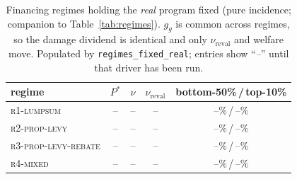 \documentclass[12pt]{article}
\providecommand{\pendingnum}{\textit{--}}
\providecommand{\RDefRealP}{\pendingnum}\providecommand{\RLevRealP}{\pendingnum}
\providecommand{\RRebRealP}{\pendingnum}\providecommand{\RMixRealP}{\pendingnum}
\providecommand{\RDefRealRev}{\pendingnum}\providecommand{\RLevRealRev}{\pendingnum}
\providecommand{\RRebRealRev}{\pendingnum}\providecommand{\RMixRealRev}{\pendingnum}
\providecommand{\RDefRealNu}{\pendingnum}\providecommand{\RLevRealNu}{\pendingnum}
\providecommand{\RRebRealNu}{\pendingnum}\providecommand{\RMixRealNu}{\pendingnum}
\providecommand{\RDefRealBfifty}{\pendingnum}\providecommand{\RLevRealBfifty}{\pendingnum}
\providecommand{\RRebRealBfifty}{\pendingnum}\providecommand{\RMixRealBfifty}{\pendingnum}
\providecommand{\RDefRealTten}{\pendingnum}\providecommand{\RLevRealTten}{\pendingnum}
\providecommand{\RRebRealTten}{\pendingnum}\providecommand{\RMixRealTten}{\pendingnum}
\begin{document}
\begin{table}[!htb]
\centering
\caption{Financing regimes holding the \emph{real} program fixed (pure
incidence; companion to Table~\ref{tab:regimes}). $g_g$ is common across
regimes, so the damage dividend is identical and only $\nu_{\mathrm{reval}}$ and
welfare move. Populated by \texttt{regimes\_fixed\_real}; entries show
``\pendingnum'' until that driver has been run.}
\label{tab:regimesreal}
\begin{tabular}{lcccc}
\toprule
regime & $P^{*}$ & $\nu$ & $\nu_{\mathrm{reval}}$ & bottom-50\%\,/\,top-10\% \\
\midrule
\textsc{r1-lumpsum}         & $\RDefRealP$ & $\RDefRealNu$ & $\RDefRealRev$ & $\RDefRealBfifty\%$\,/\,$\RDefRealTten\%$ \\
\textsc{r2-prop-levy}       & $\RLevRealP$ & $\RLevRealNu$ & $\RLevRealRev$ & $\RLevRealBfifty\%$\,/\,$\RLevRealTten\%$ \\
\textsc{r3-prop-levy-rebate}& $\RRebRealP$ & $\RRebRealNu$ & $\RRebRealRev$ & $\RRebRealBfifty\%$\,/\,$\RRebRealTten\%$ \\
\textsc{r4-mixed}           & $\RMixRealP$ & $\RMixRealNu$ & $\RMixRealRev$ & $\RMixRealBfifty\%$\,/\,$\RMixRealTten\%$ \\
\bottomrule
\end{tabular}
\end{table}
\end{document}
